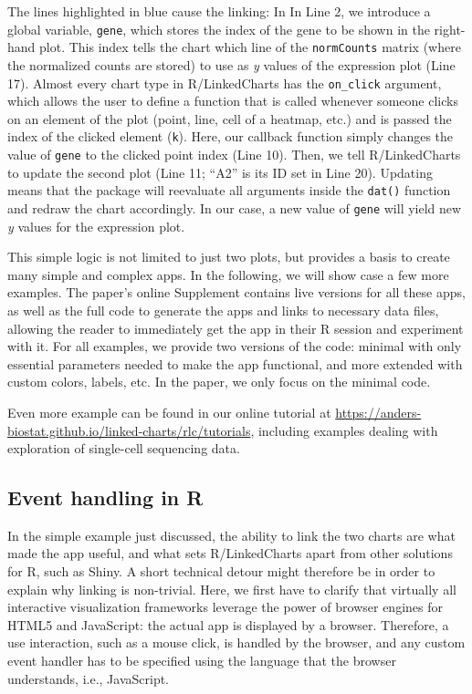 \documentclass[twocolumn,10pt]{article}
\begin{document}
The lines highlighted in blue cause the linking: In In Line 2, we introduce a global variable, \texttt{gene}, which stores the index of the gene to be shown in the right-hand plot. This index tells the chart which line of the \texttt{normCounts} matrix (where the normalized counts are stored) to use as \emph{y} values of the expression plot (Line 17). Almost every chart type in R/LinkedCharts has the \texttt{on_click} argument, which allows the user to define a function that is called whenever someone clicks on an element of the plot (point, line, cell of a heatmap, etc.) and is passed the index of the clicked element (\texttt{k}).  Here, our callback function simply changes the value of \texttt{gene} to the clicked point index (Line 10). Then, we tell R/LinkedCharts to update the second plot (Line 11; ``A2'' is its ID set in Line 20). Updating means that the package will reevaluate all arguments inside the \texttt{dat()} function and redraw the chart accordingly. In our case, a new value of \texttt{gene} will yield new \emph{y} values for the expression plot.

This simple logic is not limited to just two plots, but provides a basis to create many simple and complex apps. In the following, we will show case a few more examples. The paper's online Supplement contains live versions for all these apps, as well as the full code to generate the apps and links to necessary data files, allowing the reader to immediately get the app in their R session and experiment with it. For all examples, we provide two versions of the code: minimal with only essential parameters needed to make the app functional, and more extended with custom colors, labels, etc. In the paper, we only focus on the minimal code.

Even more example can be found in our online tutorial at \url{https://anders-biostat.github.io/linked-charts/rlc/tutorials}, including examples dealing with exploration of single-cell sequencing data.

\subsection{Event handling in R}

In the simple example just discussed, the ability to link the two charts are what made the app useful, and what sets R/LinkedCharts apart from other solutions for R, such as Shiny. A short technical detour might therefore be in order to explain why linking is non-trivial. Here, we first have to clarify that virtually all interactive visualization frameworks leverage the power of browser engines for HTML5 and JavaScript: the actual app is displayed by a browser. Therefore, a use interaction, such as a mouse click, is handled by the browser, and any custom event handler has to be specified using the language that the browser understands, i.e., JavaScript. 
\end{document}
